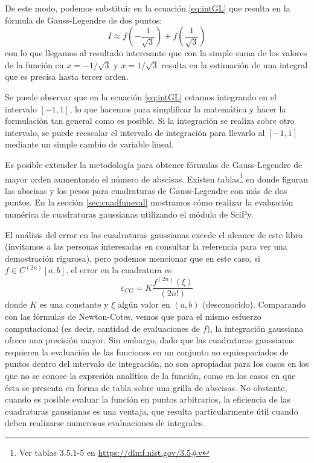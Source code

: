 De este modo, podemos substituir en la ecuación \eqref{eq:intGL} que resulta en la fórmula de Gauss-Legendre de dos puntos:
\begin{equation}\label{eq:intGL2}
 I \approx f\left( -\frac{1}{\sqrt{3}} \right) + f\left( \frac{1}{\sqrt{3}} \right)
\end{equation} 
con lo que llegamos al resultado interesante que con la simple suma de los valores de la función en $x = -1/\sqrt{3}$ y $x = 1/\sqrt{3}$ resulta en la estimación de una integral que es precisa hasta tercer orden.

Se puede observar que en la ecuación \eqref{eq:intGL} estamos integrando en el intervalo $[-1, 1]$, lo que hacemos para simplificar la matemática y hacer la formulación tan general como es posible. Si la integración se realiza sobre otro intervalo, se puede reescalar el intervalo de integración para llevarlo al $[-1, 1]$ mediante un simple cambio de variable lineal.

Es posible extender la metodología para obtener fórmulas de Gauss-Legendre de mayor orden aumentando el número de abscisas. Existen tablas\footnote{Ver tablas 3.5.1-5 en \url{https://dlmf.nist.gov/3.5\#v}} en donde figuran las abscisas y los pesos para cuadraturas de Gauss-Legendre con más de dos puntos. En la sección \ref{sec:cuadfuneval} mostramos cómo realizar la evaluación numérica de cuadraturas gaussianas utilizando el módulo  de SciPy. 

El análisis del error en las cuadraturas gaussianas excede el alcance de este libro (invitamos a las personas interesadas en consultar la referencia \cite{stoer2002} para ver una demostración rigurosa), pero podemos mencionar que en este caso, si $f \in C^{(2n)} [a, b]$, el error en la cuadratura es
\begin{equation}
    \varepsilon_{CG} = K \frac{f^{(2n)}(\xi)}{(2n!)}
\end{equation} 
donde $K$ es una constante y $\xi$ algún valor en $(a, b)$ (desconocido). Comparando con las fórmulas de Newton-Cotes, vemos que para el mismo esfuerzo computacional (es decir, cantidad de evaluaciones de $f$), la integración gaussiana ofrece una precisión mayor. Sin embargo, dado que las cuadraturas gaussianas requieren la evaluación de las funciones en un conjunto no equiespaciados de puntos dentro del intervalo de integración, no son apropiadas para los casos en los que no se conoce la expresión analítica de la función, como en los casos en que ésta se presenta en forma de tabla sobre una grilla de abscisas. No obstante, cuando es posible evaluar la función en puntos arbitrarios, la eficiencia de las cuadraturas gaussianas es una ventaja, que resulta particularmente útil cuando deben realizarse numerosas evaluaciones de integrales.




